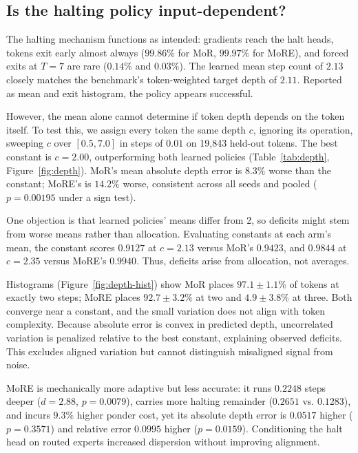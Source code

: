 \documentclass{article}
\begin{document}
\subsection{Is the halting policy input-dependent?}
\label{sec:depth}

The halting mechanism functions as intended: gradients reach the halt heads, tokens exit early almost always ($99.86\%$ for MoR, $99.97\%$ for MoRE), and forced exits at $T=7$ are rare ($0.14\%$ and $0.03\%$). The learned mean step count of $2.13$ closely matches the benchmark's token-weighted target depth of $2.11$. Reported as mean and exit histogram, the policy appears successful.

However, the mean alone cannot determine if token depth depends on the token itself. To test this, we assign every token the same depth $c$, ignoring its operation, sweeping $c$ over $[0.5,7.0]$ in steps of $0.01$ on 19,843 held-out tokens. The best constant is $c=2.00$, outperforming both learned policies (Table~\ref{tab:depth}, Figure~\ref{fig:depth}). MoR's mean absolute depth error is $8.3\%$ worse than the constant; MoRE's is $14.2\%$ worse, consistent across all seeds and pooled ($p=0.00195$ under a sign test).

One objection is that learned policies' means differ from 2, so deficits might stem from worse means rather than allocation. Evaluating constants at each arm's mean, the constant scores $0.9127$ at $c=2.13$ versus MoR's $0.9423$, and $0.9844$ at $c=2.35$ versus MoRE's $0.9940$. Thus, deficits arise from allocation, not averages.

Histograms (Figure~\ref{fig:depth-hist}) show MoR places $97.1 \pm 1.1\%$ of tokens at exactly two steps; MoRE places $92.7 \pm 3.2\%$ at two and $4.9 \pm 3.8\%$ at three. Both converge near a constant, and the small variation does not align with token complexity. Because absolute error is convex in predicted depth, uncorrelated variation is penalized relative to the best constant, explaining observed deficits. This excludes aligned variation but cannot distinguish misaligned signal from noise.

MoRE is mechanically more adaptive but less accurate: it runs $0.2248$ steps deeper ($d=2.88$, $p=0.0079$), carries more halting remainder ($0.2651$ vs. $0.1283$), and incurs $9.3\%$ higher ponder cost, yet its absolute depth error is $0.0517$ higher ($p=0.3571$) and relative error $0.0995$ higher ($p=0.0159$). Conditioning the halt head on routed experts increased dispersion without improving alignment.
\end{document}
